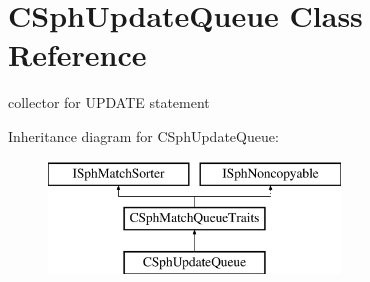 \hypertarget{classCSphUpdateQueue}{\section{C\-Sph\-Update\-Queue Class Reference}
\label{classCSphUpdateQueue}
}


collector for U\-P\-D\-A\-T\-E statement  


Inheritance diagram for C\-Sph\-Update\-Queue\-:\begin{figure}[H]
\begin{center}
\leavevmode
\includegraphics[height=3.000000cm]{classCSphUpdateQueue}
\end{center}
\end{figure}
